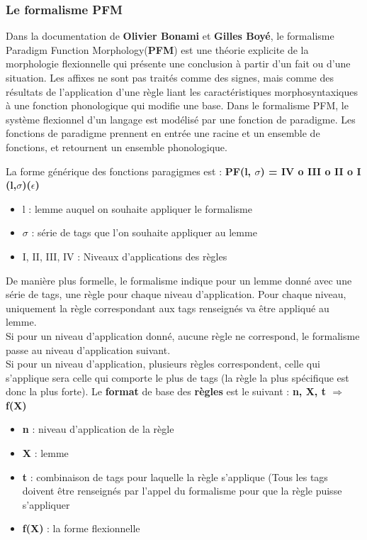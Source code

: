 \documentclass[a4paper, 12pt]{article}
\begin{document}
\subsubsection{Le formalisme PFM}
Dans la documentation \cite{Formalisme} de \textbf{Olivier Bonami} et \textbf{Gilles Boyé}, le formalisme Paradigm Function Morphology(\textbf{PFM})  est une théorie explicite de la morphologie flexionnelle qui présente une conclusion à partir d'un fait ou d'une situation. Les affixes ne sont pas traités comme des signes, mais comme des résultats de l'application d'une règle liant les caractéristiques morphosyntaxiques à une fonction phonologique qui modifie une base.
Dans le formalisme PFM, le système flexionnel d'un langage est modélisé par une fonction de paradigme.
Les fonctions de paradigme prennent en entrée une racine et un ensemble de fonctions, et retournent un ensemble phonologique.

La forme générique des fonctions paragigmes est : \textbf{PF(l, $\sigma$) = IV o III o II o I (l,$\sigma$)($\epsilon$)}
\begin{itemize}
    \item l : lemme auquel on souhaite appliquer le formalisme
    \item $\sigma$ : série de tags que l'on souhaite appliquer au lemme
    \item I, II, III, IV : Niveaux d'applications des règles
\end{itemize}

\smallbreak

De manière plus formelle, le formalisme indique pour un lemme donné avec une série de tags, une règle pour chaque niveau d'application. Pour chaque niveau, uniquement la règle correspondant  aux tags renseignés va être appliqué au lemme.\\
Si pour un niveau d'application donné, aucune règle ne correspond, le formalisme passe au niveau d'application suivant. \\
Si pour un niveau d'application, plusieurs règles correspondent, celle qui s'applique sera celle qui comporte le plus de tags (la règle la plus spécifique est donc la plus forte).
Le \textbf{format} de base des \textbf{règles} est le suivant : \textbf{n, X, t $\Longrightarrow$ f(X) } \\
\begin{itemize}
    \item \textbf{n} : niveau d’application de la règle
    \item \textbf{X} : lemme
    \item \textbf{t} : combinaison de tags pour laquelle la règle s'applique (Tous les tags doivent être renseignés par l'appel du formalisme pour que la règle puisse s'appliquer
    \item \textbf{f(X)} : la forme flexionnelle
\end{itemize}
\end{document}
